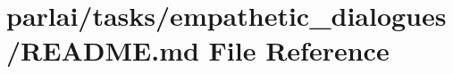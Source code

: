 \hypertarget{parlai_2tasks_2empathetic__dialogues_2README_8md}{}\section{parlai/tasks/empathetic\+\_\+dialogues/\+R\+E\+A\+D\+ME.md File Reference}
\label{parlai_2tasks_2empathetic__dialogues_2README_8md}
